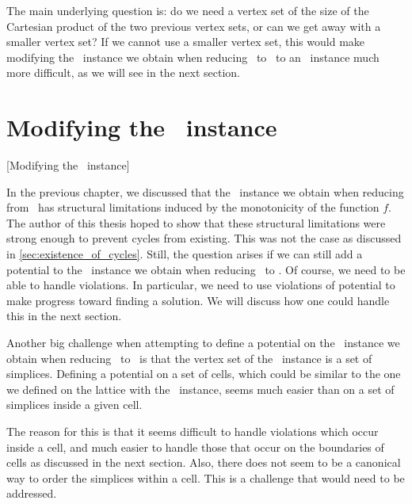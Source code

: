 The main underlying question is: do we need a vertex set of the size of the Cartesian product of the two previous vertex sets, or can we get away with a smaller vertex set? If we cannot use a smaller vertex set, this would make modifying the \EndOfLine\ instance we obtain when reducing \Tarskistar\ to \EndOfLine\ to an \EndOfPotentialLine\ instance much more difficult, as we will see in the next section.

\section{Modifying the \EndOfLine\ instance}[Modifying the \EndOfLine\ instance]

In the previous chapter, we discussed that the \EndOfLine\ instance we obtain when reducing from \Tarskistar\ has structural limitations induced by the monotonicity of the function $f$. The author of this thesis hoped to show that these structural limitations were strong enough to prevent cycles from existing. This was not the case as discussed in \cref{sec:existence_of_cycles}. Still, the question arises if we can still add a potential to the \EndOfLine\ instance we obtain when reducing \Tarskistar\ to \EndOfLine\@. Of course, we need to be able to handle violations. In particular, we need to use violations of potential to make progress toward finding a solution. We will discuss how one could handle this in the next section.

Another big challenge when attempting to define a potential on the \EndOfLine\ instance we obtain when reducing \Tarskistar\ to \EndOfLine\ is that the vertex set of the \EndOfLine\ instance is a set of simplices. Defining a potential on a set of cells, which could be similar to the one we defined on the lattice with the \Localopt\ instance, seems much easier than on a set of simplices inside a given cell.

The reason for this is that it seems difficult to handle violations which occur inside a cell, and much easier to handle those that occur on the boundaries of cells as discussed in the next section. Also, there does not seem to be a canonical way to order the simplices within a cell. This is a challenge that would need to be addressed.

